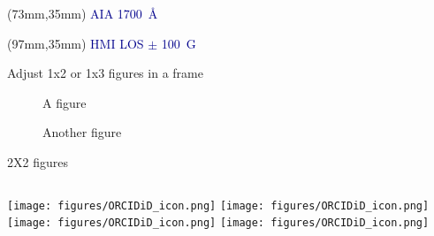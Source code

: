 \documentclass{beamer}
\begin{document}
\begin{frame}
\begin{textblock*}{40mm}(73mm,35mm)
\scriptsize \textcolor{darkblue}{AIA 1700~{\AA}}
\end{textblock*}
\begin{textblock*}{40mm}(97mm,35mm)
\scriptsize \textcolor{darkblue}{HMI LOS $\pm$ 100~G}
\end{textblock*} 
  
 
\end{frame}





\begin{frame}{Adjust 1x2 or 1x3 figures in a frame}
\begin{figure}
  \centering
  \qquad
\caption{A figure}
\label{fig:1}
\end{figure}
  
\begin{figure}
  \centering
  \qquad    
  \caption{Another figure}
\label{fig:2}
\end{figure}
\end{frame}


\begin{frame}{2X2 figures}
    \begin{columns}[t]
        \texttt{[image: figures/ORCIDiD\_icon.png]}
        \texttt{[image: figures/ORCIDiD\_icon.png]}
        \texttt{[image: figures/ORCIDiD\_icon.png]}
        \texttt{[image: figures/ORCIDiD\_icon.png]}
    \end{columns}
\end{frame}
\end{document}
